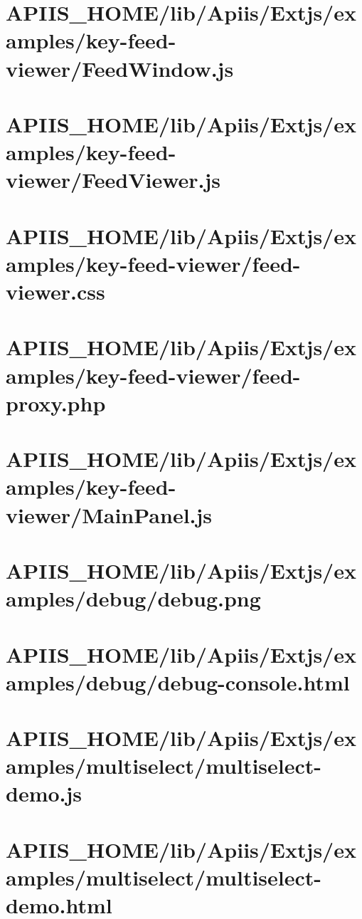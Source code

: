 \section{APIIS\_HOME/lib/Apiis/Extjs/examples/key-feed-viewer/FeedWindow.js} 
\section{APIIS\_HOME/lib/Apiis/Extjs/examples/key-feed-viewer/FeedViewer.js} 
\section{APIIS\_HOME/lib/Apiis/Extjs/examples/key-feed-viewer/feed-viewer.css} 
\section{APIIS\_HOME/lib/Apiis/Extjs/examples/key-feed-viewer/feed-proxy.php} 
\section{APIIS\_HOME/lib/Apiis/Extjs/examples/key-feed-viewer/MainPanel.js} 
\section{APIIS\_HOME/lib/Apiis/Extjs/examples/debug/debug.png} 
\section{APIIS\_HOME/lib/Apiis/Extjs/examples/debug/debug-console.html} 
\section{APIIS\_HOME/lib/Apiis/Extjs/examples/multiselect/multiselect-demo.js} 
\section{APIIS\_HOME/lib/Apiis/Extjs/examples/multiselect/multiselect-demo.html} 
